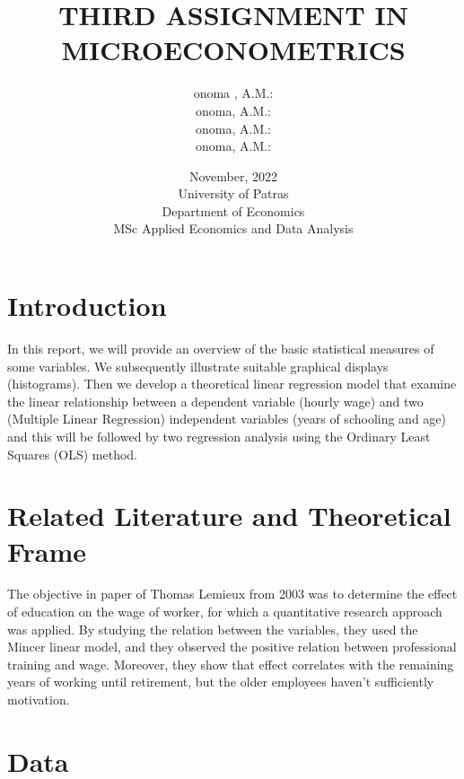 \documentclass{article}
\title{\textbf{THIRD ASSIGNMENT IN MICROECONOMETRICS}}
\author{onoma , A.M.: \\
	onoma, A.M.: \\
	onoma, A.M.: \\
	onoma, A.M.: }
\date{November, 2022\\
	University of Patras\\
	Department of Economics\\
	MSc Applied Economics and Data Analysis}
\begin{document}
\maketitle

\section{Introduction}
	
	\vspace {0.5\baselineskip}
	
	In this report, we will provide an overview of the basic statistical measures of some variables. We subsequently illustrate suitable graphical displays (histograms). Then we develop a theoretical linear regression model that examine the linear relationship between a dependent variable (hourly wage) and two (Multiple Linear Regression) independent variables (years of schooling and age) and this will be followed by two regression analysis using the Ordinary Least Squares (OLS) method. 
	
	\vspace {0.5\baselineskip}
	
\section{Related Literature and Theoretical Frame}
	
	\vspace {0.5\baselineskip}
	
	The objective in paper of Thomas Lemieux from 2003 was to determine the effect of education on the wage of worker, for which a quantitative research approach was applied. By studying the relation between the variables, they used the Mincer linear model, and they observed the positive relation between professional training and wage. Moreover, they show that effect correlates with the remaining years of working until retirement, but the older employees haven't sufficiently motivation.
	
	\vspace {0.5\baselineskip}
	
\section{Data}
	
	\vspace {0.5\baselineskip}
	
\end{document}
